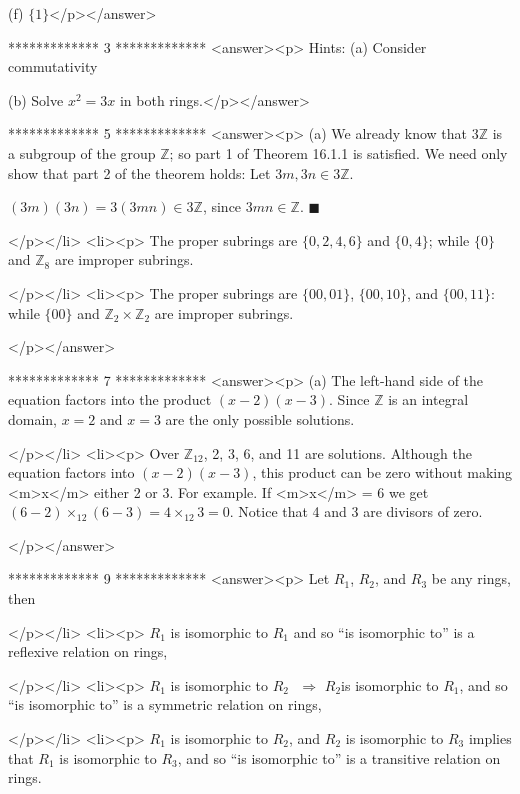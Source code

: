(f)   \(\{1\}\)</p></answer>


*************
3
*************
<answer><p> Hints: (a) Consider commutativity 



   (b) Solve \(x ^2=3x\) in both rings.</p></answer>


*************
5
*************
<answer><p> (a) We already know that \(3\mathbb{Z}\) is a subgroup of the group \(\mathbb{Z}\); so part 1 of Theorem 16.1.1 is satisfied. We need only show
that part 2 of the theorem holds: Let \(3m, 3n \in  3\mathbb{Z}\).



\((3m)(3n) = 3(3m n) \in  3\mathbb{Z}\), since \(3 m n \in \mathbb{Z}\).  \(\blacksquare\)

</p></li>
<li><p> The proper subrings are \(\{0, 2, 4, 6\}\) and \(\{0, 4\}\); while \(\{0\}\) and \(\mathbb{Z}_8\) are improper subrings.

</p></li>
<li><p>  The proper subrings are \(\{00, 01\}\), \(\{00, 10\}\), and \(\{00,11\}\): while $\{$00$\}$ and \(\mathbb{Z}_2\times \mathbb{Z}_2\) are improper
subrings.

</p></answer>


*************
7
*************
<answer><p> (a) The left-hand side of the equation factors into the product \((x-2)(x-3)\). Since $\mathbb{Z}$ is an integral domain, \(x = 2\) and \(x =
3\) are the only possible solutions.

</p></li>
<li><p> Over \(\mathbb{Z}_{12}\), 2, 3, 6, and 11 are solutions. Although the equation factors into \((x-2)(x-3)\), this product can be zero without
making <m>x</m> either 2 or 3. For example. If <m>x</m> = 6 we get  \((6-2)\times _{12}(6-3)=4 \times _{12}3 = 0\).  Notice that  4 and
3 are divisors of zero.

</p></answer>


*************
9
*************
<answer><p> Let \(R_1\), \(R_2\), and \(R_3\)  be any rings, then

</p></li>
<li><p>  \(R_1\) is isomorphic to \(R_1\) and so {``}is isomorphic to{''} is a reflexive relation on rings,

</p></li>
<li><p>  \(R_1\) is isomorphic to \(R_2\text{  }\Rightarrow\) \(R_2\)is isomorphic to \(R_1\), and so {``}is isomorphic to{''} is a symmetric relation
on rings,

</p></li>
<li><p>  \(R_1\) is isomorphic to \(R_2\), and \(R_2\) is isomorphic to \(R_3\) implies that \(R_1\) is isomorphic to \(R_3\), and so {``}is isomorphic
to{''} is a transitive relation on rings.



